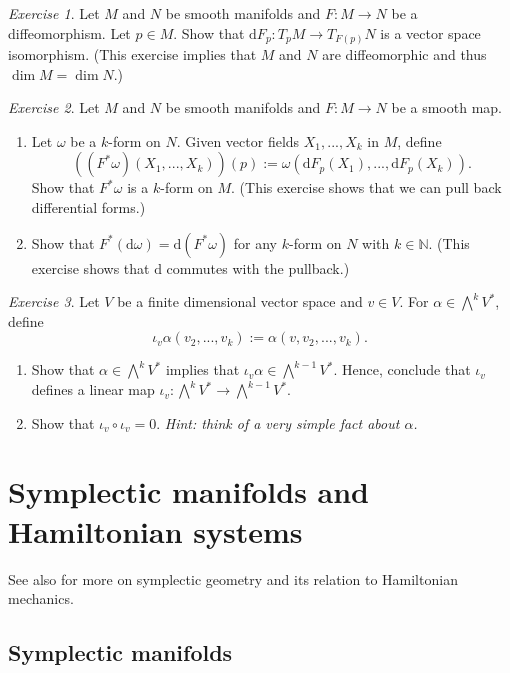 \documentclass[11pt]{amsart}
\numberwithin{equation}{section}
\theoremstyle{plain}
\theoremstyle{definition}
\theoremstyle{remark}
\newtheorem{exe}{Exercise}[subsection]
\newcommand{\N}{\mathbb{N}}
\newcommand{\dd}{{\mathrm{d}}}
\begin{document}
\begin{exe}
Let $M$ and $N$ be smooth manifolds and $F\colon M\to N$ be a diffeomorphism. Let $p\in M$. Show that $\dd F_p\colon T_pM\to T_{F(p)}N$ is a vector space isomorphism. (This exercise implies that $M$ and $N$ are diffeomorphic and thus $\dim M=\dim N$.)
\end{exe}

\begin{exe}
Let $M$ and $N$ be smooth manifolds and $F\colon M\to N$ be a smooth map. 
\begin{enumerate}
\item{Let $\omega$ be a $k$-form on $N$. Given vector fields $X_1,...,X_k$ in $M$, define 
$$((F^*\omega)(X_1,...,X_k))(p):=\omega(\dd F_p(X_1),...,\dd F_p(X_k)).$$
Show that $F^*\omega$ is a $k$-form on $M$. (This exercise shows that we can pull back differential forms.)
}
\item{Show that $F^*(\dd \omega)=\dd(F^*\omega)$ for any $k$-form on $N$ with $k\in\N$. (This exercise shows that $\dd$ commutes with the pullback.)
}
\end{enumerate}
\end{exe}


\begin{exe}
Let $V$ be a finite dimensional vector space and $v\in V$. For $\alpha\in\bigwedge^kV^*$, define 
$$\iota_v\alpha(v_2,...,v_k):=\alpha(v,v_2,...,v_k).$$
\begin{enumerate}
\item{Show that $\alpha\in\bigwedge^k V^*$ implies that $\iota_v\alpha\in \bigwedge^{k-1}V^*$. Hence, conclude that $\iota_v$ defines a linear map $\iota_v\colon \bigwedge^kV^*\to \bigwedge^{k-1}V^*$.
}
\item{Show that $\iota_v\circ \iota_v=0$. \emph{Hint: think of a very simple fact about $\alpha$.}
}
\end{enumerate}
\end{exe}


\section{Symplectic manifolds and Hamiltonian systems}
See also \cite{daSilva01} for more on symplectic geometry and its relation to Hamiltonian mechanics.

\subsection{Symplectic manifolds}
\end{document}
